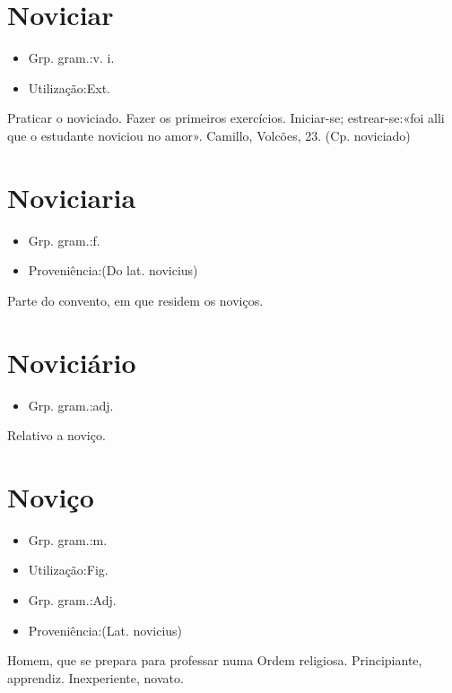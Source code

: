 \section{Noviciar}
\begin{itemize}
\item {Grp. gram.:v. i.}
\end{itemize}
\begin{itemize}
\item {Utilização:Ext.}
\end{itemize}
Praticar o noviciado.
Fazer os primeiros exercícios.
Iniciar-se; estrear-se:«\textunderscore foi alli que o estudante noviciou no amor\textunderscore ». Camillo, \textunderscore Volcões\textunderscore , 23.
(Cp. \textunderscore noviciado\textunderscore )
\section{Noviciaria}
\begin{itemize}
\item {Grp. gram.:f.}
\end{itemize}
\begin{itemize}
\item {Proveniência:(Do lat. \textunderscore novicius\textunderscore )}
\end{itemize}
Parte do convento, em que residem os noviços.
\section{Noviciário}
\begin{itemize}
\item {Grp. gram.:adj.}
\end{itemize}
Relativo a noviço.
\section{Noviço}
\begin{itemize}
\item {Grp. gram.:m.}
\end{itemize}
\begin{itemize}
\item {Utilização:Fig.}
\end{itemize}
\begin{itemize}
\item {Grp. gram.:Adj.}
\end{itemize}
\begin{itemize}
\item {Proveniência:(Lat. \textunderscore novicius\textunderscore )}
\end{itemize}
Homem, que se prepara para professar numa Ordem religiosa.
Principiante, apprendiz.
Inexperiente, novato.
